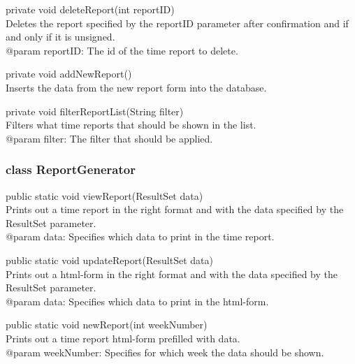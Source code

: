 \documentclass[a4paper]{article}
\begin{document}
\vspace{5mm}
\begin{hangparas}{1.5em}{1}
private void deleteReport(int reportID)\\
Deletes the report specified by the reportID parameter after confirmation and if and only if it is unsigned.\\
@param reportID: The id of the time report to delete.
\end{hangparas}

\vspace{5mm}
\begin{hangparas}{1.5em}{1}
private void addNewReport()\\
Inserts the data from the new report form into the database.
\end{hangparas}

\vspace{5mm}
\begin{hangparas}{1.5em}{1}
private void filterReportList(String filter)\\
Filters what time reports that should be shown in the list.\\
@param filter: The filter that should be applied.\\
\end{hangparas}


\subsubsection{class ReportGenerator}

\begin{hangparas}{1.5em}{1}
public static void viewReport(ResultSet data)\\
Prints out a time report in the right format and with the data specified by the ResultSet parameter.\\
@param data: Specifies which data to print in the time report. 
\end{hangparas}

\vspace{5mm}
\begin{hangparas}{1.5em}{1}
public static void updateReport(ResultSet data)\\
Prints out a html-form in the right format and with the data specified by the ResultSet parameter.\\ 
@param data: Specifies which data to print in the html-form.
\end{hangparas}

\vspace{5mm}
\begin{hangparas}{1.5em}{1}
public static void newReport(int weekNumber)\\
Prints out a time report html-form prefilled with data.\\
@param weekNumber: Specifies for which week the data should be shown.\\
\end{hangparas}
 
\end{document}
